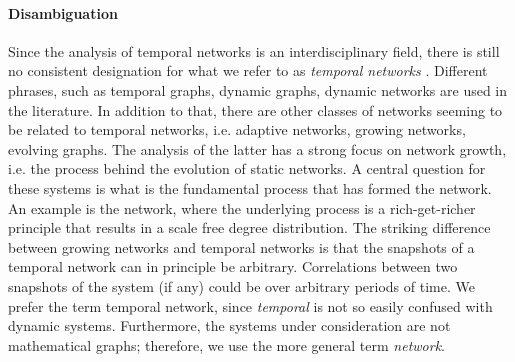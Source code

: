 \paragraph{Disambiguation\color{Cayenne}{.}}
Since the analysis of temporal networks is an interdisciplinary field, there is still no consistent designation for what we refer to as \emph{temporal networks} \citep{Holme_review}.
Different phrases, such as temporal graphs, dynamic graphs, dynamic networks are used in the literature.
In addition to that, there are other classes of networks seeming to be related to temporal networks, i.e. adaptive networks, growing networks, evolving graphs.
The analysis of the latter has a strong focus on network growth, i.e. the process behind the evolution of static networks.
A central question for these systems is what is the fundamental process that has formed the network.
An example is the \BA network, where the underlying process is a rich-get-richer principle that results in a scale free degree distribution.
The striking difference between growing networks and temporal networks is that the snapshots of a temporal network can in principle be arbitrary.
Correlations between two snapshots of the system (if any) could be over arbitrary periods of time.
We prefer the term temporal network, since \emph{temporal} is not so easily confused with dynamic systems.
Furthermore, the systems under consideration are not mathematical graphs; therefore, we use the more general term \emph{network}.

